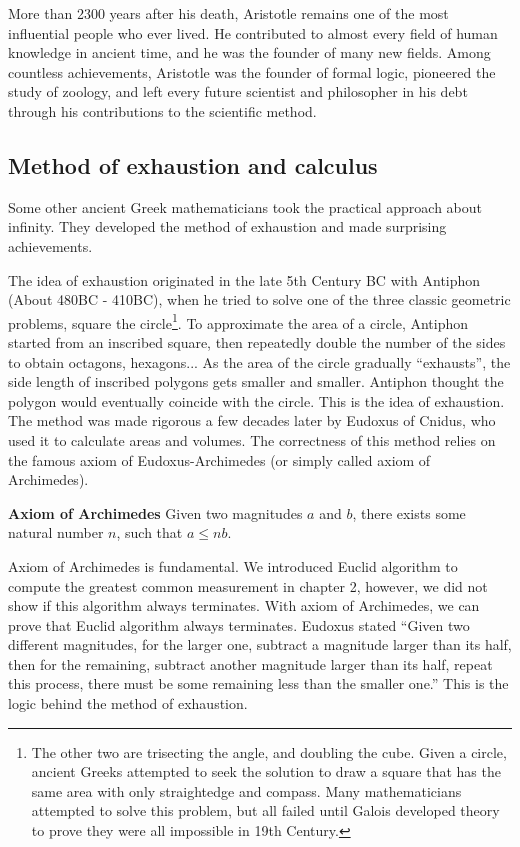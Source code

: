 \documentclass{article}
\begin{document}
More than 2300 years after his death, Aristotle remains one of the most influential people who ever lived. He contributed to almost every field of human knowledge in ancient time, and he was the founder of many new fields. Among countless achievements, Aristotle was the founder of formal logic, pioneered the study of zoology, and left every future scientist and philosopher in his debt through his contributions to the scientific method.

\subsection{Method of exhaustion and calculus}

Some other ancient Greek mathematicians took the practical approach about infinity. They developed the method of exhaustion and made surprising achievements.

The idea of exhaustion originated in the late 5th Century BC with Antiphon (About 480BC - 410BC), when he tried to solve one of the three classic geometric problems, square the circle\footnote{The other two are trisecting the angle, and doubling the cube. Given a circle, ancient Greeks attempted to seek the solution to draw a square that has the same area with only straightedge and compass. Many mathematicians attempted to solve this problem, but all failed until Galois developed theory to prove they were all impossible in 19th Century.}. To approximate the area of a circle, Antiphon started from an inscribed square, then repeatedly double the number of the sides to obtain octagons, hexagons... As the area of the circle gradually ``exhausts'', the side length of inscribed polygons gets smaller and smaller. Antiphon thought the polygon would eventually coincide with the circle. This is the idea of exhaustion. The method was made rigorous a few decades later by Eudoxus of Cnidus, who used it to calculate areas and volumes. The correctness of this method relies on the famous axiom of Eudoxus-Archimedes (or simply called axiom of Archimedes).

\begin{axiom}
\normalfont
\textbf{Axiom of Archimedes} Given two magnitudes $a$ and $b$, there exists some natural number $n$, such that $a \leq nb$.
\end{axiom}

Axiom of Archimedes is fundamental. We introduced Euclid algorithm to compute the greatest common measurement in chapter 2, however, we did not show if this algorithm always terminates. With axiom of Archimedes, we can prove that Euclid algorithm always terminates. Eudoxus stated ``Given two different magnitudes, for the larger one, subtract a magnitude larger than its half, then for the remaining, subtract another magnitude larger than its half, repeat this process, there must be some remaining less than the smaller one.'' This is the logic behind the method of exhaustion.
\end{document}
